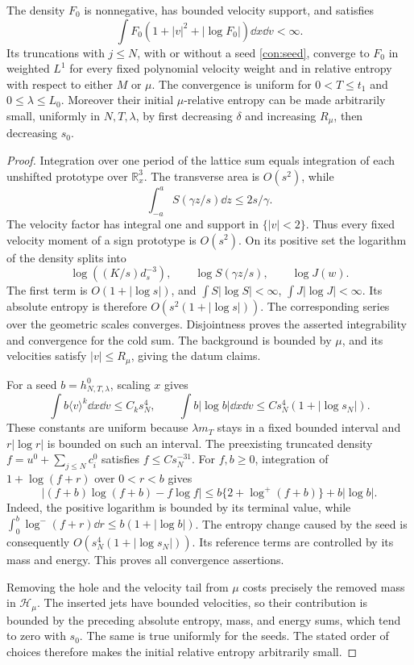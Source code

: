\begin{lemma}\label{con:datum}
The density \(F_0\) is nonnegative, has bounded velocity support, and
satisfies
\[
 \int F_0(1+|v|^2+|\log F_0|)\dd x\dd v<\infty.
\]
Its truncations with \(j\le N\), with or without a seed
\eqref{con:seed}, converge to \(F_0\) in weighted \(L^1\) for every
fixed polynomial velocity weight and in relative entropy with respect
to either \(M\) or \(\mu\).  The convergence is uniform for
\(0<T\le t_1\) and \(0\le\lambda\le L_0\).
Moreover their initial \(\mu\)-relative entropy can be made arbitrarily
small, uniformly in \(N,T,\lambda\), by first decreasing \(\delta\)
and increasing \(R_\mu\), then decreasing \(s_0\).
\end{lemma}
\begin{proof}
Integration over one period of the lattice sum equals integration of
each unshifted prototype over \(\mathbb R^3_x\).  The transverse area
is \(O(s^2)\), while
\[
 \int_{-a}^a S(\gamma z/s)\dd z\le 2s/\gamma.
\]
The velocity factor has integral one and support in \(\{|v|<2\}\).
Thus every fixed velocity moment of a sign prototype is \(O(s^2)\).
On its positive set the logarithm of the density splits into
\[
 \log((K/s)d_s^{-3}),\qquad \log S(\gamma z/s),\qquad \log J(w).
\]
The first term is \(O(1+|\log s|)\), and
\(\int S|\log S|<\infty\), \(\int J|\log J|<\infty\).
Its absolute entropy is therefore
\(O(s^2(1+|\log s|))\).  The corresponding series over the geometric
scales converges.  Disjointness proves the asserted integrability and
convergence for the cold sum.  The background is bounded by \(\mu\),
and its velocities satisfy \(|v|\le R_\mu\), giving the datum claims.

For a seed \(b=h^0_{N,T,\lambda}\), scaling \(x\) gives
\[
 \int b\langle v\rangle^k\dd x\dd v\le C_k s_N^4,\qquad
 \int b|\log b|\dd x\dd v
       \le C s_N^4(1+|\log s_N|).
\]
These constants are uniform because \(\lambda m_T\) stays in a fixed
bounded interval and \(r|\log r|\) is bounded on such an interval.
The preexisting truncated density \(f=u^0+\sum_{j\le N}c_i^0\)
satisfies \(f\le C s_N^{-31}\).  For \(f,b\ge0\), integration of
\(1+\log(f+r)\) over \(0<r<b\) gives
\[
 |(f+b)\log(f+b)-f\log f|
 \le b\{2+\log^+(f+b)\}+b|\log b|.
\]
Indeed, the positive logarithm is bounded by its terminal value, while
\(\int_0^b\log^-(f+r)\dd r\le b(1+|\log b|)\).
The entropy change caused by the seed is consequently
\(O(s_N^4(1+|\log s_N|))\).  Its reference terms are controlled by
its mass and energy.  This proves all convergence assertions.

Removing the hole and the velocity tail from \(\mu\) costs precisely
the removed mass in \(\mathcal H_\mu\).  The inserted jets have
bounded velocities, so their contribution is bounded by the preceding
absolute entropy, mass, and energy sums, which tend to zero with
\(s_0\).  The same is true uniformly for the seeds.  The stated order
of choices therefore makes the initial relative entropy arbitrarily
small.
\end{proof}

